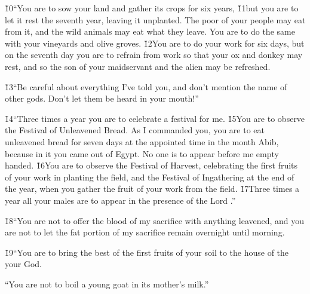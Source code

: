 \v{10}``You are to sow your land and gather its crops for six years, \v{11}but you are to let it rest the seventh year, leaving it unplanted. The poor of your people may eat from it, and the wild animals may eat what they leave. You are to do the same with your vineyards and olive groves. \v{12}You are to do your work for six days, but on the seventh day you are to refrain from work so that your ox and donkey may rest, and so the son of your maidservant and the alien may be refreshed.

\v{13}``Be careful about everything I've told you, and don't mention the name of other gods. Don't let them be heard in your mouth!''

\v{14}``Three times a year you are to celebrate a festival for me. \v{15}You are to observe the Festival of Unleavened Bread. As I commanded you, you are to eat unleavened bread for seven days at the appointed time in the month Abib, because in it you came out of Egypt. No one is to appear before me empty handed. \v{16}You are to observe the Festival of Harvest, celebrating the first fruits of your work in planting the field, and the Festival of Ingathering at the end of the year, when you gather the fruit of your work from the field. \v{17}Three times a year all your males are to appear in the presence of the Lord .''

\v{18}``You are not to offer the blood of my sacrifice with anything leavened, and you are not to let the fat portion of my sacrifice remain overnight until morning.

\v{19}``You are to bring the best of the first fruits of your soil to the house of the  your God.

``You are not to boil a young goat in its mother's milk.''

